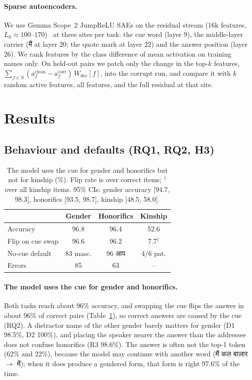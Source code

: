 \documentclass[11pt]{article}
\newcommand{\hi}[1]{{\devfont #1}}
\newcommand{\main}{\hi{मैं}}  %
\newcommand{\aap}{\hi{आप}}
\begin{document}
\paragraph{Sparse autoencoders.} We use Gemma Scope~2 JumpReLU SAEs on the residual stream (16k features, $L_0\approx100$--$170$)~\cite{gemmascope2,rajamanoharan2024} at three sites per task: the cue word (layer 9), the middle-layer carrier (\main{} at layer 20; the quote mark at layer 22) and the answer position (layer 26). We rank features by the class difference of mean activation on training names only. On held-out pairs we patch only the change in the top-$k$ features, $\sum_{f\in S}(a^\text{clean}_f-a^\text{corr}_f)\,W_\text{dec}[f]$, into the corrupt run, and compare it with $k$ random active features, all features, and the full residual at that site.

\section{Results}

\subsection{Behaviour and defaults (RQ1, RQ2, H3)}
\label{sec:behaviour}

\begin{table}[t]
\centering\small
\setlength{\tabcolsep}{4pt}
\begin{tabular}{lccc}
\toprule
 & Gender & Honorifics & Kinship \\
\midrule
Accuracy & 96.8 & 96.4 & 52.6 \\
Flip on cue swap & 96.6 & 96.2 & 7.7$^\dagger$ \\
No-cue default & 83 masc. & 96 \aap{} & 4/6 pat. \\
Errors & 85 & 63 & -- \\
\bottomrule
\end{tabular}
\caption{The model uses the cue for gender and honorifics but not for kinship (\%). Flip rate is over correct items; $^\dagger$over all kinship items. 95\% CIs: gender accuracy [94.7, 98.3], honorifics [93.5, 98.7], kinship [48.5, 58.0].}
\label{tab:behaviour}
\end{table}

\paragraph{The model uses the cue for gender and honorifics.} Both tasks reach about 96\% accuracy, and swapping the cue flips the answer in about 96\% of correct pairs (Table~\ref{tab:behaviour}), so correct answers are caused by the cue (RQ2). A distractor name of the other gender barely matters for gender (D1 98.5\%, D2 100\%), and placing the speaker nearer the answer than the addressee does not confuse honorifics (R3 98.6\%). The answer is often not the top-1 token (62\% and 22\%), because the model may continue with another word (\hi{मैं कल बाज़ार} $\to$ \hi{में}); when it does produce a gendered form, that form is right 97.6\% of the time.
\end{document}
